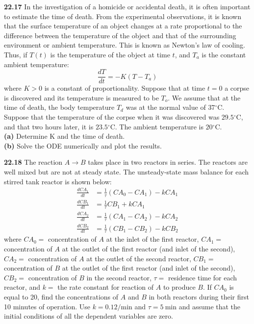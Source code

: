 \documentclass[../main.tex]{subfiles}
\begin{document}
\begin{multicols}{2}
    \noindent\textbf{22.17} In the investigation of a homicide or accidental death, it is often important to estimate the time of death. From the experimental observations, it is known that the surface temperature of an object changes at a rate proportional to the difference between the temperature of the object and that of the surrounding environment or ambient temperature.
    This is known as Newton's law of cooling. Thus, if $T(t)$ is the temperature of the object at time $t$, and $T_{a}$ is the constant ambient temperature:
    $$
    \frac{d T}{d t}=-K\left(T-T_{a}\right)
    $$
    where $K>0$ is a constant of proportionality. Suppose that at time $t=0$ a corpse is discovered and its temperature is measured to be $T_{o}$. We assume that at the time of death, the body temperature $T_{d}$ was at the normal value of $37{ }^{\circ} \mathrm{C}$. Suppose that the temperature of the corpse when it was discovered was $29.5{ }^{\circ} \mathrm{C}$, and that two hours later, it is $23.5{ }^{\circ} \mathrm{C}$.
    The ambient temperature is $20{ }^{\circ} \mathrm{C}$.\\
    \textbf{(a)} Determine K and the time of death.\\
    \textbf{(b)} Solve the ODE numerically and plot the results.\vspace{2mm}

    \noindent\textbf{22.18} The reaction $A \rightarrow B$ takes place in two reactors in series. The reactors are well mixed but are not at steady state. The unsteady-state mass balance for each stirred tank reactor is shown below:
    $$
    \begin{aligned}
    \frac{d C A_{1}}{d t} &=\frac{1}{\tau}\left(C A_{0}-C A_{1}\right)-k C A_{1} \\
    \frac{d C B_{1}}{d t} &=\frac{1}{\tau} C B_{1}+k C A_{1} \\
    \frac{d C A_{2}}{d t} &=\frac{1}{\tau}\left(C A_{1}-C A_{2}\right)-k C A_{2} \\
    \frac{d C B_{2}}{d t} &=\frac{1}{\tau}\left(C B_{1}-C B_{2}\right)-k C B_{2}
    \end{aligned}
    $$
    where $C A_{0}=$ concentration of $A$ at the inlet of the first reactor, $C A_{1}=$ concentration of $A$ at the outlet of the first reactor (and inlet of the second), $C A_{2}=$ concentration of $A$ at the outlet of the second reactor,
     $C B_{1}=$ concentration of $B$ at the outlet of the first reactor (and inlet of the second), $C B_{2}=$ concentration of $B$ in the second reactor, $\tau=$ residence time for each reactor, and $k=$ the rate constant for reaction of $A$ to produce $B$.
    If $C A_{0}$ is equal to 20, find the concentrations of $A$ and $B$ in both reactors during their first 10 minutes of operation. Use $k=0.12 / \mathrm{min}$ and $\tau=5 \mathrm{~min}$ and assume that the initial conditions of all the dependent variables are zero.\vspace{2mm}


\end{multicols}
\end{document}
